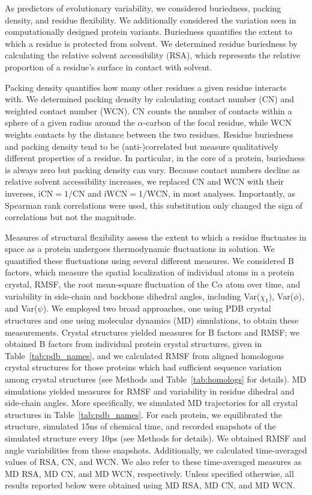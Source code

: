 \documentclass[smallextended]{svjour3}
\begin{document}
As predictors of evolutionary variability, we considered buriedness, packing density, and residue flexibility. We additionally considered the variation seen in computationally designed protein variants. Buriedness quantifies the extent to which a residue is protected from solvent. We determined residue buriedness by calculating the relative solvent accessibility (RSA), which represents the relative proportion of a residue's surface in contact with solvent.

Packing density quantifies how many other residues a given residue interacts with. We determined packing density by calculating contact number (CN) and weighted contact number (WCN). CN counts the number of contacts within a sphere of a given radius around the $\alpha$-carbon of the focal residue, while WCN weights contacts by the distance between the two residues. Residue buriedness and packing density tend to be (anti-)correlated but measure qualitatively different properties of a residue. In particular, in the core of a protein, buriedness is always zero but packing density can vary. Because contact numbers decline as relative solvent accessibility increases, we replaced CN and WCN with their inverses, $\text{iCN}=1/\text{CN}$ and $\text{iWCN}=1/\text{WCN}$, in most analyses. Importantly, as Spearman rank correlations were used, this substitution only changed the sign of correlations but not the magnitude.

Measures of structural flexibility assess the extent to which a residue fluctuates in space as a protein undergoes thermodynamic fluctuations in solution. We quantified these fluctuations using several different measures. We considered B factors, which measure the spatial localization of individual atoms in a protein crystal, RMSF, the root mean-square fluctuation of the C$\alpha$ atom over time, and variability in side-chain and backbone dihedral angles, including Var($\chi_1$), Var($\phi$), and Var($\psi$). We employed two broad approaches, one using PDB crystal structures and one using molecular dynamics (MD) simulations, to obtain these measurements. Crystal structures yielded measures for B factors and RMSF; we obtained B factors from individual protein crystal structures, given in Table~\ref{tab:pdb_names}, and we calculated RMSF from aligned homologous crystal structures for those proteins which had sufficient sequence variation among crystal structures (see Methods and Table~\ref{tab:homologs} for details). MD simulations yielded measures for RMSF and variability in residue dihedral and side-chain angles. More specifically, we simulated MD trajectories for all crystal structures in Table~\ref{tab:pdb_names}. For each protein, we equilibrated the structure, simulated 15ns of chemical time, and recorded snapshots of the simulated structure every 10ps (see Methods for details). We obtained RMSF and angle variabilities from these snapshots. Additionally, we calculated time-averaged values of RSA, CN, and WCN. We also refer to these time-averaged measures as MD RSA, MD CN, and MD WCN, respectively. Unless specified otherwise, all results reported below were obtained using MD RSA, MD CN, and MD WCN.
\end{document}
